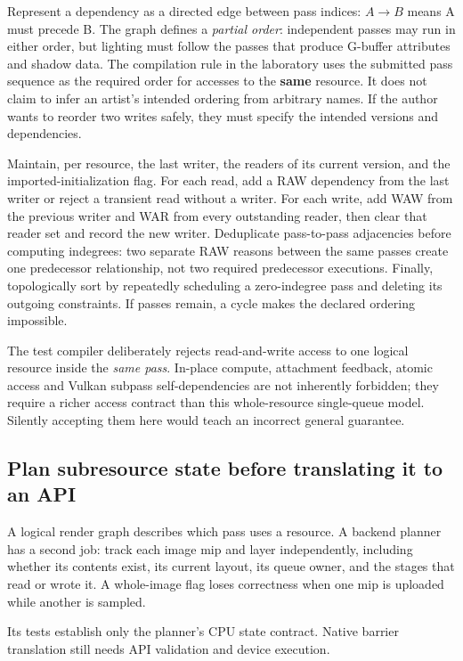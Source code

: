 Represent a dependency as a directed edge between pass indices: \(A\to B\) means A must precede B. The graph defines a \emph{partial order}: independent passes may run in either order, but lighting must follow the passes that produce G-buffer attributes and shadow data. The compilation rule in the laboratory uses the submitted pass sequence as the required order for accesses to the \textbf{same} resource. It does not claim to infer an artist's intended ordering from arbitrary names. If the author wants to reorder two writes safely, they must specify the intended versions and dependencies.

Maintain, per resource, the last writer, the readers of its current version, and the imported-initialization flag. For each read, add a RAW dependency from the last writer or reject a transient read without a writer. For each write, add WAW from the previous writer and WAR from every outstanding reader, then clear that reader set and record the new writer. Deduplicate pass-to-pass adjacencies before computing indegrees: two separate RAW reasons between the same passes create one predecessor relationship, not two required predecessor executions. Finally, topologically sort by repeatedly scheduling a zero-indegree pass and deleting its outgoing constraints. If passes remain, a cycle makes the declared ordering impossible.

The test compiler deliberately rejects read-and-write access to one logical resource inside the \emph{same pass}. In-place compute, attachment feedback, atomic access and Vulkan subpass self-dependencies are not inherently forbidden; they require a richer access contract than this whole-resource single-queue model. Silently accepting them here would teach an incorrect general guarantee.

\subsection{Plan subresource state before translating it to an API}\label{06-engine-ii-ch042-plan-subresource-state-before-translating-it-to-an-api}

A logical render graph describes which pass uses a resource. A backend planner has a second job: track each image mip and layer independently, including whether its contents exist, its current layout, its queue owner, and the stages that read or wrote it. A whole-image flag loses correctness when one mip is uploaded while another is sampled.

Its tests establish only the planner's CPU state contract. Native barrier translation still needs API validation and device execution.

